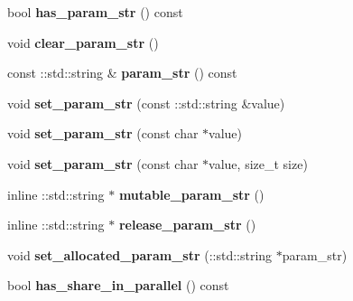 \begin{DoxyCompactItemize}
bool {\bfseries has\+\_\+param\+\_\+str} () const
\item 
\mbox{\label{classcaffe_1_1_python_parameter_a6c679b0b9c8c278422b8dd6dd9ee3856}} 
void {\bfseries clear\+\_\+param\+\_\+str} ()
\item 
\mbox{\label{classcaffe_1_1_python_parameter_aabb50077182bf040269d6f0dbb07042b}} 
const \+::std\+::string \& {\bfseries param\+\_\+str} () const
\item 
\mbox{\label{classcaffe_1_1_python_parameter_a8e63697964518f4e45d8e49cf34854ac}} 
void {\bfseries set\+\_\+param\+\_\+str} (const \+::std\+::string \&value)
\item 
\mbox{\label{classcaffe_1_1_python_parameter_a8b90795bc1b8dffd61e116faa1697b93}} 
void {\bfseries set\+\_\+param\+\_\+str} (const char $\ast$value)
\item 
\mbox{\label{classcaffe_1_1_python_parameter_a6844e8e3b4ecf9908f91b8f0386ff499}} 
void {\bfseries set\+\_\+param\+\_\+str} (const char $\ast$value, size\+\_\+t size)
\item 
\mbox{\label{classcaffe_1_1_python_parameter_a368987a6cf217f1bb4fd4ba9bb0f1dc2}} 
inline \+::std\+::string $\ast$ {\bfseries mutable\+\_\+param\+\_\+str} ()
\item 
\mbox{\label{classcaffe_1_1_python_parameter_ac353ee490db443e9522bf80ab859b568}} 
inline \+::std\+::string $\ast$ {\bfseries release\+\_\+param\+\_\+str} ()
\item 
\mbox{\label{classcaffe_1_1_python_parameter_a6862bddbb70ba2b5db1c672400219802}} 
void {\bfseries set\+\_\+allocated\+\_\+param\+\_\+str} (\+::std\+::string $\ast$param\+\_\+str)
\item 
\mbox{\label{classcaffe_1_1_python_parameter_abf6e28ac800ea4b9cb18fe6d4a0ff28e}} 
bool {\bfseries has\+\_\+share\+\_\+in\+\_\+parallel} () const
\item 

\end{DoxyCompactItemize}
